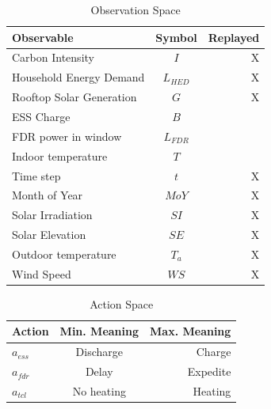 \begin{table}
\caption{Observation Space}
\label{tab:observation_space}
\vskip 0.15in
\begin{center}
\begin{small}
\begin{sc}
\begin{tabular}{lcr}
\toprule
Observable & Symbol & Replayed\\
\midrule
Carbon Intensity & $I$ & X\\
    Household Energy Demand & $L_{HED}$ & X\\
    Rooftop Solar Generation & $G$ & X\\
    ESS Charge & $B$ & \\
    FDR power in window & $L_{FDR}$ &\\
    Indoor temperature & $T$ & \\
    Time step & $t$ & X\\
    Month of Year & $MoY$ & X \\
    Solar Irradiation & $SI$ & X\\
    Solar Elevation & $SE$ & X\\
    Outdoor temperature & $T_a$ & X \\
    Wind Speed & $WS$ & X\\
\bottomrule
\end{tabular}
\end{sc}
\end{small}
\end{center}
\vskip -0.1in
\end{table}

\begin{table}
\caption{Action Space}
\label{tab:action_space}
\vskip 0.15in
\begin{center}
\begin{small}
\begin{sc}
\begin{tabular}{lcr}
\toprule
Action & Min. Meaning & Max. Meaning\\
\midrule
$a_{ess}$ & Discharge & Charge \\ 
    $a_{fdr}$ & Delay     & Expedite \\
    $a_{tcl}$ & No heating& Heating\\
\bottomrule
\end{tabular}
\end{sc}
\end{small}
\end{center}
\vskip -0.1in
\end{table}

